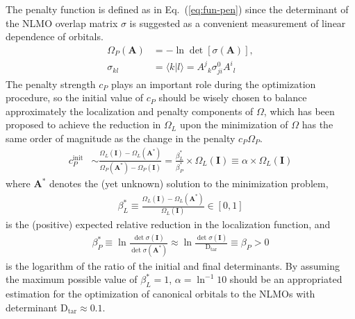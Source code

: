 \documentclass[aps,prl,reprint,amsmath,amssymb]{revtex4-1}
\newcommand{\braket}[2]{\ensuremath{\langle #1 \vert #2 \rangle}} %
\begin{document}
The penalty function is defined as in Eq.~(\ref{eq:fun-pen}) since the determinant of the NLMO overlap matrix $\sigma$ is suggested as a convenient measurement of linear dependence of orbitals. 
%
\begin{equation} \label{eq:fun-pen}
\begin{split}
\Omega_P(\mathbf{A}) &= - \ln \det \left[ \sigma (\mathbf{A}) \right], \\
\sigma_{kl} &= \braket{k}{l} = {A^j}_k \sigma_{ji}^0{A^i}_l
\end{split}
\end{equation}
%
The penalty strength $c_P$ plays an important role during the optimization procedure, so the initial value of  $c_P$ should be wisely chosen  to balance  approximately the localization and penalty components of $\Omega$, which has been proposed to achieve the reduction in $\Omega_L$ upon the minimization of $\Omega$ has the same order of magnitude as the change in the penalty  $c_P\Omega_P$.
%
\begin{equation} \label{eq:cp-beta}
\begin{split} 
c_P^{\text{init}} & \sim \frac{ \Omega_{L}(\mathbf{I}) - \Omega_{L}(\mathbf{A}^{\ast}) }{ \Omega_{P}(\mathbf{A}^{\ast}) - \Omega_{P}(\mathbf{I}) } = \frac{ \beta_L^{\ast} }{ \beta_P^{\ast} } \times \Omega_{L}(\mathbf{I}) \equiv \alpha \times \Omega_L(\mathbf{I})
\end{split}
\end{equation}
%
where $\mathbf{A}^{\ast}$ denotes the (yet unknown) solution to the minimization problem, 
%
\begin{equation} 
\begin{split} 
\beta_L^{\ast} \equiv \frac{\Omega_L(\mathbf{I})- \Omega_L(\mathbf{A}^{\ast})}{\Omega_L(\mathbf{I})} \in [0,1]
\end{split}
\end{equation}
%
is the (positive) expected relative reduction in the localization function, and 
%
\begin{equation} \label{eq:betap}
\begin{split} 
\beta_P^{\ast} \equiv \ln \frac{\det \sigma(\mathbf{I})}{ \det \sigma(\mathbf{A}^{\ast}) } \approx \ln \frac{\det \sigma(\mathbf{I})}{ \text{D}_{\text{tar}} } \equiv \beta_P > 0
\end{split}
\end{equation}
%
is the logarithm of the ratio of the initial and final determinants.
By assuming the maximum possible value of $\beta_L^{\ast}=1$, $\alpha = \ln^{-1} 10$ should be an appropriated estimation for the optimization of canonical orbitals to the NLMOs with determinant $ \text{D}_{\text{tar}} \approx 0.1$.
\end{document}
